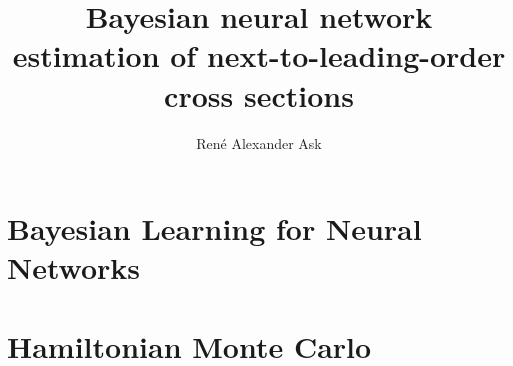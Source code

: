 \documentclass[UKenglish]{book}
\title{Bayesian neural network estimation of next-to-leading-order cross sections}
\author{René Alexander Ask}
\begin{document}
\duoforside[dept={Department of Physics},
  program={Master's Program Name},
  long]

\frontmatter{}


\tableofcontents{}

\mainmatter{}

	



\chapter{Bayesian Learning for Neural Networks}\label{chap:bnn}



\chapter{Hamiltonian Monte Carlo}\label{chap:hmc}


%
%
%
%
%

%

%

% 
% 
% 
\end{document}
